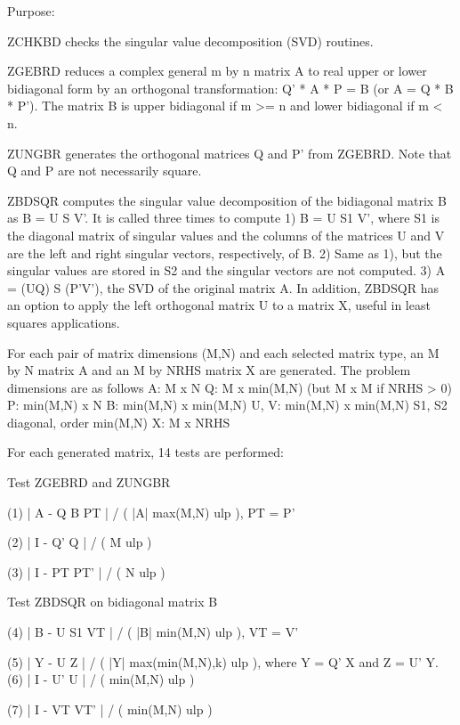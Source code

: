 \begin{DoxyParagraph}{Purpose\+: }
\begin{DoxyVerb} ZCHKBD checks the singular value decomposition (SVD) routines.

 ZGEBRD reduces a complex general m by n matrix A to real upper or
 lower bidiagonal form by an orthogonal transformation: Q' * A * P = B
 (or A = Q * B * P').  The matrix B is upper bidiagonal if m >= n
 and lower bidiagonal if m < n.

 ZUNGBR generates the orthogonal matrices Q and P' from ZGEBRD.
 Note that Q and P are not necessarily square.

 ZBDSQR computes the singular value decomposition of the bidiagonal
 matrix B as B = U S V'.  It is called three times to compute
    1)  B = U S1 V', where S1 is the diagonal matrix of singular
        values and the columns of the matrices U and V are the left
        and right singular vectors, respectively, of B.
    2)  Same as 1), but the singular values are stored in S2 and the
        singular vectors are not computed.
    3)  A = (UQ) S (P'V'), the SVD of the original matrix A.
 In addition, ZBDSQR has an option to apply the left orthogonal matrix
 U to a matrix X, useful in least squares applications.

 For each pair of matrix dimensions (M,N) and each selected matrix
 type, an M by N matrix A and an M by NRHS matrix X are generated.
 The problem dimensions are as follows
    A:          M x N
    Q:          M x min(M,N) (but M x M if NRHS > 0)
    P:          min(M,N) x N
    B:          min(M,N) x min(M,N)
    U, V:       min(M,N) x min(M,N)
    S1, S2      diagonal, order min(M,N)
    X:          M x NRHS

 For each generated matrix, 14 tests are performed:

 Test ZGEBRD and ZUNGBR

 (1)   | A - Q B PT | / ( |A| max(M,N) ulp ), PT = P'

 (2)   | I - Q' Q | / ( M ulp )

 (3)   | I - PT PT' | / ( N ulp )

 Test ZBDSQR on bidiagonal matrix B

 (4)   | B - U S1 VT | / ( |B| min(M,N) ulp ), VT = V'

 (5)   | Y - U Z | / ( |Y| max(min(M,N),k) ulp ), where Y = Q' X
                                                  and   Z = U' Y.
 (6)   | I - U' U | / ( min(M,N) ulp )

 (7)   | I - VT VT' | / ( min(M,N) ulp )


\end{DoxyVerb}
\end{DoxyParagraph}

